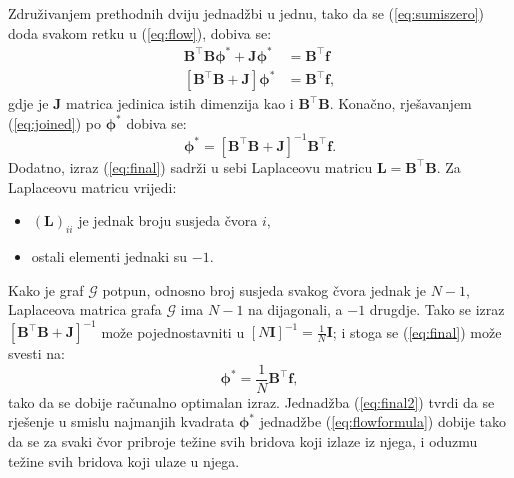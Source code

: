\documentclass[lmodern, utf8, diplomski, numeric]{fer}
\newcommand{\matr}[1]{\mathbold{#1}}
\newcommand{\graph}[1]{\mathcal{#1}}
\newcommand{\T}{\top}
\newcommand{\q}{\left}
\newcommand{\w}{\right}
\begin{document}
  Združivanjem prethodnih dviju jednadžbi u jednu, tako da se (\ref{eq:sumiszero}) doda svakom retku u (\ref{eq:flow}), dobiva se:
  \begin{align}
  \matr{B}^\T \matr{B} \matr{\phi^*} + \matr{J} \matr{\phi^*} &= \matr{B}^\T \matr{f} \nonumber \\
  \label{eq:joined}
  \q[\matr{B}^\T \matr{B} + \matr{J} \w] \matr{\phi^*} &= \matr{B}^\T \matr{f},
  \end{align}
  gdje je $\matr{J}$ matrica jedinica istih dimenzija kao i $\matr{B}^\T \matr{B}$.
  Konačno, rješavanjem (\ref{eq:joined}) po $\matr{\phi^*}$ dobiva se:
  \begin{equation}
  \label{eq:final}
  \matr{\phi^*} = \q[\matr{B}^\T \matr{B} + \matr{J} \w]^{-1} \matr{B}^\T \matr{f}.
  \end{equation}
  Dodatno, izraz (\ref{eq:final}) sadrži u sebi Laplaceovu matricu $\matr{L} = \matr{B}^\T\matr{B}$.
  Za Laplaceovu matricu vrijedi:
  \begin{itemize}
    \item $(\matr{L})_{ii}$ je jednak broju susjeda čvora $i$,
    \item ostali elementi jednaki su $-1$.
  \end{itemize}
  Kako je graf $\graph{G}$ potpun, odnosno broj susjeda svakog čvora jednak je $N - 1$, Laplaceova matrica grafa $\graph{G}$ ima $N - 1$ na dijagonali, a $-1$ drugdje. Tako se izraz $\q[ \matr{B}^\T \matr{B} + \matr{J} \w]^{-1}$ može pojednostavniti u $\q[ N \matr{I} \w]^{-1} = \frac{1}{N} \matr{I}$; i stoga se (\ref{eq:final}) može svesti na:
  \begin{equation}
  \label{eq:final2}
  \matr{\phi^*} = \frac{1}{N} \matr{B}^\T \matr{f},
  \end{equation}
  tako da se dobije računalno optimalan izraz.
  Jednadžba (\ref{eq:final2}) tvrdi da se rješenje u smislu najmanjih kvadrata $\matr{\phi^*}$ jednadžbe (\ref{eq:flowformula}) dobije tako da se za svaki čvor pribroje težine svih bridova koji izlaze iz njega, i oduzmu težine svih bridova koji ulaze u njega.
  
\end{document}

